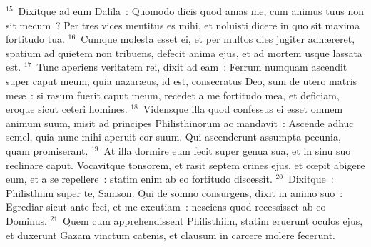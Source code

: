 ${}^{15}$~Dixitque ad eum Dalila~: Quomodo dicis quod amas me, cum animus tuus non sit mecum~? Per tres vices mentitus es mihi, et noluisti dicere in quo sit maxima fortitudo tua.
${}^{16}$~Cumque molesta esset ei, et per multos dies jugiter adh\ae reret, spatium ad quietem non tribuens, defecit anima ejus, et ad mortem usque lassata est.
${}^{17}$~Tunc aperiens veritatem rei, dixit ad eam~: Ferrum numquam ascendit super caput meum, quia nazar\ae us, id est, consecratus Deo, sum de utero matris me\ae~: si rasum fuerit caput meum, recedet a me fortitudo mea, et deficiam, eroque sicut ceteri homines.
${}^{18}$~Vidensque illa quod confessus ei esset omnem animum suum, misit ad principes Philisthinorum ac mandavit~: Ascende adhuc semel, quia nunc mihi aperuit cor suum. Qui ascenderunt assumpta pecunia, quam promiserant.
${}^{19}$~At illa dormire eum fecit super genua sua, et in sinu suo reclinare caput. Vocavitque tonsorem, et rasit septem crines ejus, et cœpit abigere eum, et a se repellere~: statim enim ab eo fortitudo discessit.
${}^{20}$~Dixitque~: Philisthiim super te, Samson. Qui de somno consurgens, dixit in animo suo~: Egrediar sicut ante feci, et me excutiam~: nesciens quod recessisset ab eo Dominus.
${}^{21}$~Quem cum apprehendissent Philisthiim, statim eruerunt oculos ejus, et duxerunt Gazam vinctum catenis, et clausum in carcere molere fecerunt.


